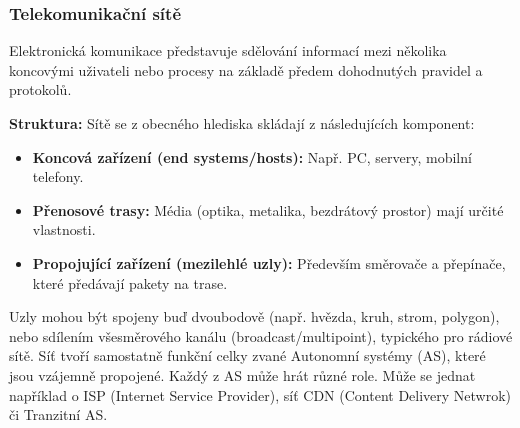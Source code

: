     \subsubsection{Telekomunikační sítě}
        Elektronická komunikace představuje sdělování informací mezi několika koncovými uživateli nebo procesy na základě předem dohodnutých pravidel a protokolů.
        
        \textbf{Struktura:} Sítě se z obecného hlediska skládají z následujících komponent:
        \begin{itemize}
            \item \textbf{Koncová zařízení (end systems/hosts):} Např. PC, servery, mobilní telefony.
            \item \textbf{Přenosové trasy:} Média (optika, metalika, bezdrátový prostor) mají určité vlastnosti.
            \item \textbf{Propojující zařízení (mezilehlé uzly):} Především směrovače a přepínače, které předávají pakety na trase.
        \end{itemize}
        
        Uzly mohou být spojeny buď dvoubodově (např. hvězda, kruh, strom, polygon), nebo sdílením všesměrového kanálu (broadcast/multipoint), typického pro rádiové sítě. Síť tvoří samostatně funkční celky zvané Autonomní systémy (AS), které jsou vzájemně propojené. Každý z AS může hrát různé role. Může se jednat například o ISP (Internet Service Provider), síť CDN (Content Delivery Netwrok) či Tranzitní AS.

